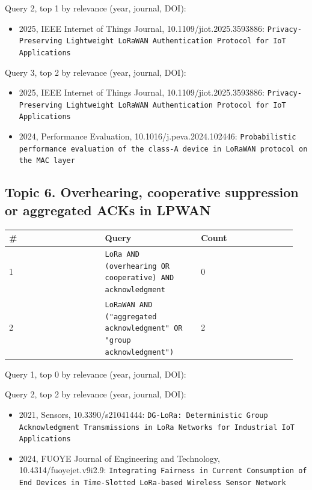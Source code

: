 Query 2, top 1 by relevance (year, journal, DOI):

\begin{itemize}
\item 2025, IEEE Internet of Things Journal, 10.1109/jiot.2025.3593886: \texttt{Privacy-Preserving Lightweight LoRaWAN Authentication Protocol for IoT Applications}
\end{itemize}

Query 3, top 2 by relevance (year, journal, DOI):

\begin{itemize}
\item 2025, IEEE Internet of Things Journal, 10.1109/jiot.2025.3593886: \texttt{Privacy-Preserving Lightweight LoRaWAN Authentication Protocol for IoT Applications}
\item 2024, Performance Evaluation, 10.1016/j.peva.2024.102446: \texttt{Probabilistic performance evaluation of the class-A device in LoRaWAN protocol on the MAC layer}
\end{itemize}

\subsection*{Topic 6. Overhearing, cooperative suppression or aggregated ACKs in LPWAN}

{\scriptsize\raggedright
\begin{longtable}{p{0.317\linewidth}p{0.317\linewidth}p{0.317\linewidth}}
\toprule
\# & Query & Count \\
\midrule
\endhead
1 & \texttt{LoRa AND (overhearing OR cooperative) AND acknowledgment} & 0 \\
2 & \texttt{LoRaWAN AND ("aggregated acknowledgment" OR "group acknowledgment")} & 2 \\
\bottomrule
\end{longtable}}

Query 1, top 0 by relevance (year, journal, DOI):


Query 2, top 2 by relevance (year, journal, DOI):

\begin{itemize}
\item 2021, Sensors, 10.3390/s21041444: \texttt{DG-LoRa: Deterministic Group Acknowledgment Transmissions in LoRa Networks for Industrial IoT Applications}
\item 2024, FUOYE Journal of Engineering and Technology, 10.4314/fuoyejet.v9i2.9: \texttt{Integrating Fairness in Current Consumption of End Devices in Time-Slotted LoRa-based Wireless Sensor Network}
\end{itemize}

